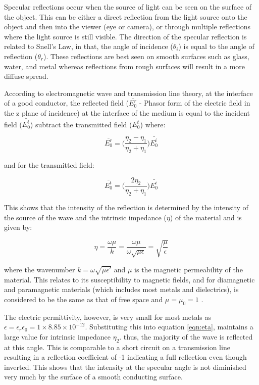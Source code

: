 \documentclass[fleqn,twoside,12pt]{report}
\begin{document}
Specular reflections occur when the source of light can be seen on the surface of the object. This can be either a direct reflection from the light source onto the object and then into the viewer (eye or camera), or through multiple reflections where the light source is still visible. The direction of the specular reflection is related to Snell's Law, in that, the angle of incidence ($\theta_i$) is equal to the angle of reflection ($\theta_r$). These reflections are best seen on smooth surfaces such as glass, water, and metal whereas reflections from rough surfaces will result in a more diffuse spread.   

According to electromagnetic wave and transmission line theory, at the interface of a good conductor, the reflected field ($\bar{E_0^r}$ - Phasor form of the electric field in the z plane of incidence) at the interface of the medium is equal to the incident field ($\bar{E_0^i}$) subtract the transmitted field ($\bar{E_0^t}$) \cite{ulaby} where:

\begin{equation}
\bar{E_0^r} = \bigg(\frac{\eta_2 - \eta_1}{\eta_2 + \eta_1}\bigg)\bar{E_0^i}
\end{equation}

and for the transmitted field:

\begin{equation}
\bar{E_0^t} = \bigg(\frac{2\eta_2}{\eta_2 + \eta_1}\bigg)\bar{E_0^i}
\end{equation}


This shows that the intensity of the reflection is determined by the intensity of the source of the wave and the intrinsic impedance ($\eta$) of the material and is given by:

\begin{equation}
\eta = \frac{\omega \mu}{k} = \frac{\omega \mu}{\omega \sqrt{\mu \epsilon}}= \sqrt{\frac{\mu}{\epsilon}}
\label{eqn:eta}
\end{equation}

where the wavenumber $k = \omega \sqrt{\mu \epsilon'}$ and $\mu$ is the magnetic permeability of the material. This relates to its susceptibility to magnetic fields, and for diamagnetic and paramagnetic materials (which includes most metals and dielectrics), is considered to be the same as that of free space and $\mu = \mu_0 = 1$ \cite{ulaby}. 

The electric permittivity, however, is very small for most metals as $\epsilon = \epsilon_r \epsilon_0 = 1 \times 8.85\times10^{-12}$. Substituting this into equation \ref{eqn:eta}, maintains a large value for intrinsic impedance $\eta_2$. thus, the majority of the wave is reflected at this angle. This is comparable to a short circuit on a transmission line resulting in a reflection coefficient of -1 indicating a full reflection even though inverted. This shows that the intensity at the specular angle is not diminished very much by the surface of a smooth conducting surface.
\end{document}
